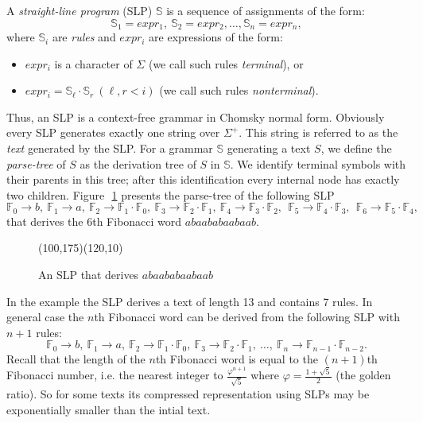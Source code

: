 ﻿\documentclass[11pt]{article}
\theoremstyle{remark}
\newcommand{\slp}[1]{\mathbb{#1}}
\begin{document}
A \emph{straight-line program} (SLP) $\slp{S}$ is a sequence of assignments of
the form: $$\slp{S}_1 = expr_1,\ \slp{S}_2 = expr_2, \dots, \slp{S}_n =
expr_n,$$ where $\slp{S}_i$ are \emph{rules} and $expr_i$ are expressions of
the form:
\begin{itemize}
\item $expr_i$ is a character of $\Sigma$ (we call such rules \emph{terminal}), or
\item $expr_i = \slp{S}_\ell\cdot \slp{S}_r \ (\ell, r < i)$ (we call such rules \emph{nonterminal}).
\end{itemize}

Thus, an SLP is a context-free grammar in Chomsky normal form. Obviously every SLP generates exactly one string over
$\Sigma^+$. This string is referred to as the \emph{text} generated by the SLP. For a grammar $\slp{S}$ generating a text
$S$, we define the \emph{parse-tree} of $S$ as the derivation tree of $S$ in $\slp{S}$. We identify terminal symbols with
their parents in this tree; after this identification every internal node has exactly two children.
Figure~\,\ref{fibonacci_word_slp} presents the parse-tree of the following SLP $$ \slp{F}_0{\to} b,\ \slp{F}_1{\to} a,\
\slp{F}_2{\to} \slp{F}_1\cdot\slp{F}_0,\ \slp{F}_3{\to} \slp{F}_2\cdot\slp{F}_1,\ \slp{F}_4{\to}
\slp{F}_3\cdot\slp{F}_2,\ \ \slp{F}_5{\to} \slp{F}_4\cdot\slp{F}_3,\ \ \slp{F}_6{\to} \slp{F}_5\cdot\slp{F}_4,$$ that
derives the 6th Fibonacci word $abaababaabaab$.
\begin{figure}[hb]
    \begin{center}
        \begin{picture}(100,175)(120,10)
            \fibonacciwordslp
        \end{picture}
    \end{center}
    \caption{An SLP that derives $abaababaabaab$}
    \label{fibonacci_word_slp}
\end{figure}

In the example the SLP derives a text of length 13 and contains 7 rules. In general case the $n$th Fibonacci word can be derived
from the following SLP with $n+1$ rules: $$\slp{F}_0\to b,\ \slp{F}_1\to a,\ \slp{F}_2\to \slp{F}_1\cdot\slp{F}_0,\ \slp{F}_3\to
\slp{F}_2\cdot\slp{F}_1,\ \dots,\ \slp{F}_n\to \slp{F}_{n-1}\cdot\slp{F}_{n-2}.$$ Recall that the length of the $n$th Fibonacci
word is equal to the $(n+1)$th Fibonacci number, i.e. the nearest integer to  $\frac{\varphi^{n+1}}{\sqrt{5}}$ where
$\varphi=\frac{1+\sqrt{5}}2$ (the golden ratio). So for some texts its compressed representation using SLPs may be
exponentially smaller than the intial text.
\end{document}
